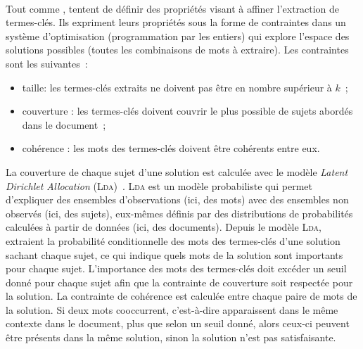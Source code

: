         \label{subsubsec:main-state_of_the_art-automatic_keyphrase_extraction-unsupervised_keyphrase_extraction-statistical_approaches:ilp}
        ~\\Tout comme ,
         tentent de définir des
        propriétés visant à affiner l'extraction de termes-clés. Ils expriment leurs propriétés sous
        la forme de contraintes dans un système d'optimisation (programmation
        par les entiers) qui explore l'espace des solutions possibles (toutes
        les combinaisons de mots à extraire). Les contraintes sont les
        suivantes~:
        \begin{itemize}
          \item{taille: les termes-clés extraits ne doivent pas être en nombre
                supérieur à $k$~;}
          \item{couverture : les termes-clés doivent couvrir le plus possible de
                sujets abordés dans le document~;}
          \item{cohérence : les mots des termes-clés doivent être cohérents
                entre eux.}
        \end{itemize}
        La couverture de chaque sujet d'une solution est calculée avec le modèle
        \textit{Latent Dirichlet Allocation} (\textsc{Lda})~\cite{blei2003lda}.
        \textsc{Lda} est un modèle probabiliste qui permet d'expliquer des
        ensembles d'observations (ici, des mots) avec des ensembles non observés
        (ici, des sujets), eux-mêmes définis par des distributions de
        probabilités calculées à partir de données (ici, des documents). Depuis
        le modèle \textsc{Lda}, 
        extraient la probabilité conditionnelle des mots des termes-clés d'une
        solution sachant chaque sujet, ce qui indique quels mots de la solution
        sont importants pour chaque sujet. L'importance des mots des termes-clés
        doit excéder un seuil donné pour chaque sujet afin que la contrainte de
        couverture soit respectée pour la solution. La contrainte de cohérence
        est calculée entre chaque paire de mots de la solution. Si deux mots
        cooccurrent, c'est-à-dire apparaissent dans le même contexte dans le
        document, plus que selon un seuil donné, alors ceux-ci peuvent être
        présents dans la même solution, sinon la solution n'est pas
        satisfaisante.
        
